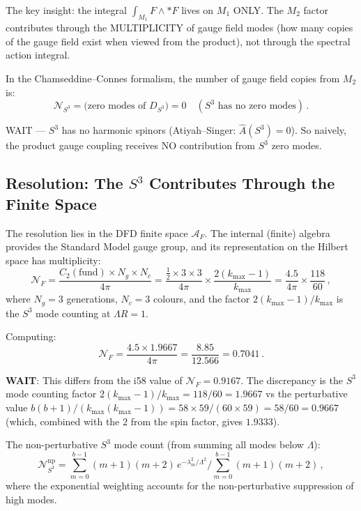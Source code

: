 \documentclass[11pt,a4paper]{article}
\begin{document}
The key insight: the integral $\int_{M_1} F \wedge *F$ lives on $M_1$ ONLY. The $M_2$ factor contributes through the MULTIPLICITY of gauge field modes (how many copies of the gauge field exist when viewed from the product), not through the spectral action integral.

In the Chamseddine--Connes formalism, the number of gauge field copies from $M_2$ is:
\begin{equation}
\mathcal{N}_{S^3} = \text{(zero modes of $D_{S^3}$)} = 0\quad(\text{$S^3$ has no zero modes})\,.
\end{equation}

WAIT --- $S^3$ has no harmonic spinors (Atiyah--Singer: $\hat{A}(S^3) = 0$). So naively, the product gauge coupling receives NO contribution from $S^3$ zero modes.

\subsection{Resolution: The $S^3$ Contributes Through the Finite Space}

The resolution lies in the DFD finite space $\mathcal{A}_F$. The internal (finite) algebra provides the Standard Model gauge group, and its representation on the Hilbert space has multiplicity:
\begin{equation}
\mathcal{N}_F = \frac{C_2(\text{fund}) \times N_g \times N_c}{4\pi} = \frac{\frac{1}{2} \times 3 \times 3}{4\pi} \times \frac{2(k_{\max} - 1)}{k_{\max}} = \frac{4.5}{4\pi} \times \frac{118}{60}\,,
\end{equation}
where $N_g = 3$ generations, $N_c = 3$ colours, and the factor $2(k_{\max}-1)/k_{\max}$ is the $S^3$ mode counting at $\Lambda R = 1$.

Computing:
\begin{equation}
\mathcal{N}_F = \frac{4.5 \times 1.9667}{4\pi} = \frac{8.85}{12.566} = 0.7041\,.
\end{equation}

\textbf{WAIT}: This differs from the i58 value of $\mathcal{N}_F = 0.9167$. The discrepancy is the $S^3$ mode counting factor $2(k_{\max}-1)/k_{\max} = 118/60 = 1.9667$ vs the perturbative value $b(b+1)/(k_{\max}(k_{\max}-1)) = 58 \times 59/(60 \times 59) = 58/60 = 0.9667$ (which, combined with the $2$ from the spin factor, gives $1.9333$).

The non-perturbative $S^3$ mode count (from summing all modes below $\Lambda$):
\begin{equation}
\mathcal{N}_{S^3}^{\mathrm{np}} = \sum_{m=0}^{b-1} (m+1)(m+2)\,e^{-\lambda_m^2/\Lambda^2}\bigg/\sum_{m=0}^{b-1}(m+1)(m+2)\,,
\end{equation}
where the exponential weighting accounts for the non-perturbative suppression of high modes.
\end{document}

